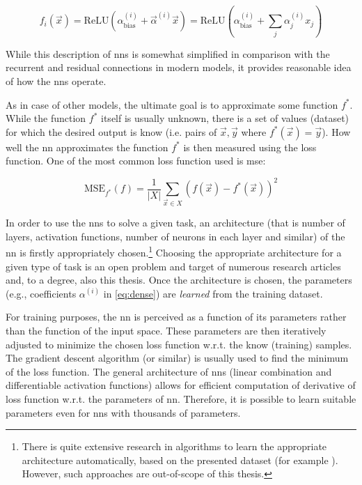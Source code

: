 \begin{equation}
    \label{eq:dense}
    f_i(\vec{x}) = \mathrm{ReLU}\left(\alpha_{\mathrm{bias}}^{(i)} + \vec{\alpha}^{(i)} \vec{x}\right) = \mathrm{ReLU}\left(\alpha_{\mathrm{bias}}^{(i)} + \sum_{j}\alpha_j^{(i)}x_j\right)
\end{equation}

While this description of \glspl{nn} is somewhat simplified in comparison with the recurrent and residual connections in modern models, it provides reasonable idea of how the \glspl{nn} operate.

As in case of other  models, the ultimate goal is to approximate some function $f^*$. While the function $f^*$ itself is usually unknown, there is a set of values (dataset) for which the desired output is know (i.e. pairs of $\vec{x}, \vec{y}$ where $f^*(\vec{x}) = \vec{y}$). How well the \gls{nn} approximates the function $f^*$ is then measured using the loss function. One of the most common loss function used is \gls{mse}:

$$\text{MSE}_{f^*}(f) = \frac{1}{|X|} \sum_{\vec{x} \in X} (f(\vec{x}) - f^*(\vec{x}))^2$$

In order to use the \glspl{nn} to solve a given task, an architecture (that is number of layers, activation functions, number of neurons in each layer and similar) of the \gls{nn} is firstly appropriately chosen.\footnote{There is quite extensive research in algorithms to learn the appropriate architecture automatically, based on the presented dataset (for example \cite{neat}). However, such approaches are out-of-scope of this thesis.} Choosing the appropriate architecture for a given type of task is an open problem and target of numerous research articles and, to a degree, also this thesis. Once the architecture is chosen, the parameters (e.g., coefficients $\alpha^{(i)}$ in \autoref{eq:dense}) are \emph{learned} from the training dataset.

For training purposes, the \gls{nn} is perceived as a function of its parameters rather than the function of the input space. These parameters are then iteratively adjusted to minimize the chosen loss function w.r.t. the know (training) samples. The gradient descent algorithm (or similar) is usually used to find the minimum of the loss function. The general architecture of \glspl{nn} (linear combination and differentiable activation functions) allows for efficient computation of derivative of loss function w.r.t. the parameters of \gls{nn}. Therefore, it is possible to learn suitable parameters even for \glspl{nn} with thousands of parameters.

